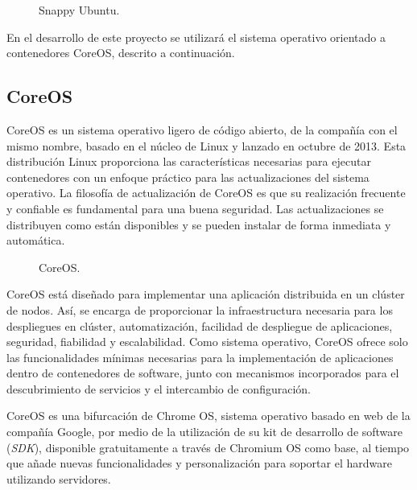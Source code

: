 \begin{figure}[H]
\caption{Snappy Ubuntu.\label{fig:figure_placement_example}}
\end{figure}

En el desarrollo de este proyecto se utilizará el sistema operativo orientado a contenedores CoreOS, descrito a continuación.

\subsection{CoreOS}

CoreOS es un sistema operativo ligero de código abierto, de la compañía con el mismo nombre, basado en el núcleo de Linux y lanzado en octubre de 2013. Esta distribución Linux proporciona las características necesarias para ejecutar contenedores con un enfoque práctico para las actualizaciones del sistema operativo. La filosofía de actualización de CoreOS es que su realización frecuente y confiable es fundamental para una buena seguridad. Las actualizaciones se distribuyen como están disponibles y se pueden instalar de forma inmediata y automática.  

\begin{figure}[H]
\caption{CoreOS.\label{fig:figure_placement_example}}
\end{figure}


CoreOS está diseñado para implementar una aplicación distribuida en un clúster de nodos. Así, se encarga de proporcionar la infraestructura necesaria para los despliegues en clúster, automatización, facilidad de despliegue de aplicaciones, seguridad, fiabilidad y escalabilidad. Como sistema operativo, CoreOS ofrece solo las funcionalidades mínimas necesarias para la implementación de aplicaciones dentro de contenedores de software, junto con mecanismos incorporados para el descubrimiento de servicios y el intercambio de configuración.

CoreOS es una bifurcación de Chrome OS, sistema operativo basado en web de la compañía Google, por medio de la utilización de su kit de desarrollo de software (\textit{SDK}), disponible gratuitamente a través de Chromium OS como base, al tiempo que añade nuevas funcionalidades y personalización para soportar el hardware utilizando servidores.


